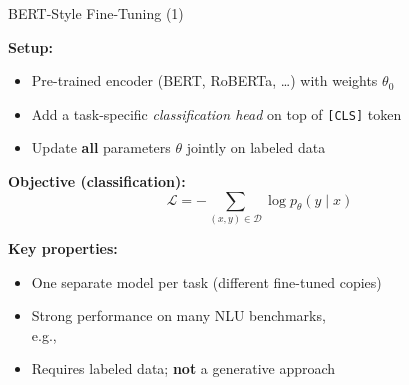 \documentclass[11pt,compress,t,notes=noshow, xcolor=table]{beamer}
\begin{document}
\begin{frame}{BERT-Style Fine-Tuning (1)}

\vfill

\textbf{Setup:}
\begin{itemize}
  \item Pre-trained encoder (BERT, RoBERTa, \ldots) with weights $\theta_0$
  \item Add a task-specific \textit{classification head} on top of \texttt{[CLS]} token
  \item Update \textbf{all} parameters $\theta$ jointly on labeled data
\end{itemize}

\vfill

\textbf{Objective (classification):}
$$\mathcal{L} = -\sum_{(x,y) \in \mathcal{D}} \log p_\theta(y \mid x)$$

\vfill

\textbf{Key properties:}
\begin{itemize}
  \item One separate model per task (different fine-tuned copies)
  \item Strong performance on many NLU benchmarks,\\e.g.,  
  \item Requires labeled data; \textbf{not} a generative approach
\end{itemize}

\vfill

\end{frame}

\end{document}
